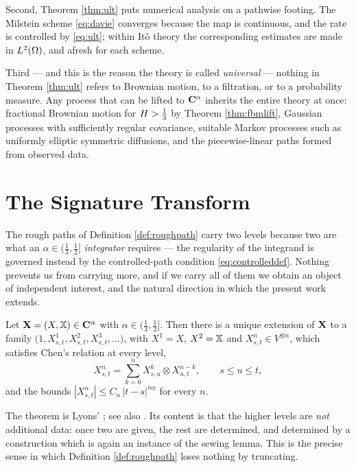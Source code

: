 Second, Theorem \ref{thm:ult} puts numerical analysis on a pathwise footing. The Milstein scheme
\eqref{eq:davie} converges because the map is continuous, and the rate is controlled by
\eqref{eq:ult}; within Itô theory the corresponding estimates are made in $L^2(\Omega)$, and afresh
for each scheme.

Third --- and this is the reason the theory is called \emph{universal} --- nothing in Theorem
\ref{thm:ult} refers to Brownian motion, to a filtration, or to a probability measure. Any process
that can be lifted to $\mathbf{C}^{\alpha}$ inherits the entire theory at once: fractional Brownian motion
for $H>\tfrac13$ by Theorem \ref{thm:fbmlift}, Gaussian processes with sufficiently regular
covariance, suitable Markov processes such as uniformly elliptic symmetric diffusions, and the
piecewise-linear paths formed from observed data.
\section{The Signature Transform}\label{sec:signature}

The rough paths of Definition \ref{def:roughpath} carry two levels because two are what an
$\alpha \in (\tfrac13,\tfrac12]$ \emph{integrator} requires --- the regularity of the integrand is
governed instead by the controlled-path condition \eqref{eq:controlleddef}. Nothing prevents us from
carrying more, and if we carry all of them we obtain an object of independent interest, and the
natural direction in which the present work extends.

\begin{theorem}\label{thm:lyonsextension}
Let $\mathbf{X} = (X,\mathbb{X}) \in \mathbf{C}^{\alpha}$ with $\alpha \in (\tfrac13,\tfrac12]$. Then there is a unique
extension of $\mathbf{X}$ to a family
$\bigl(1, X^1_{s,t}, X^2_{s,t}, X^3_{s,t},\dots\bigr)$, with $X^1 = X$, $X^2 = \mathbb{X}$ and
$X^n_{s,t} \in V^{\otimes n}$, which satisfies Chen's relation at every level,
\begin{equation}\label{eq:chenalllevels}
X^{n}_{s,t} = \sum_{k=0}^{n} X^{k}_{s,u}\otimes X^{n-k}_{u,t}, \qquad s\leq u\leq t,
\end{equation}
and the bounds $|X^n_{s,t}| \leq C_n\,|t-s|^{n\alpha}$ for every $n$. \qedopentext
\end{theorem}

The theorem is Lyons' \cite{lyons1998}; see also \cite[Ch.\ 3]{geng2021}. Its content is that the
higher levels are \emph{not} additional data: once two are given, the rest are determined, and
determined by a construction which is again an instance of the sewing lemma. This is the precise
sense in which Definition \ref{def:roughpath} loses nothing by truncating.

